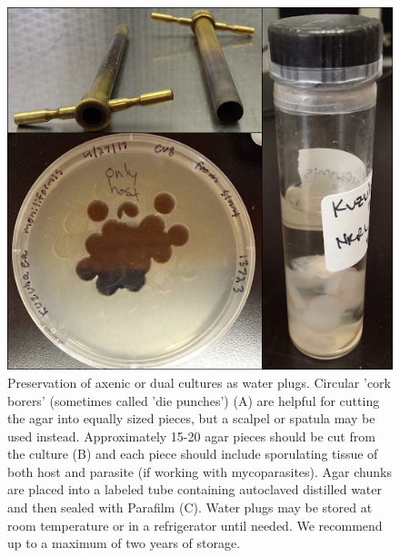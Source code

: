 \documentclass[]{book}
\begin{document}
\begin{figure}

{\centering \includegraphics[width=6.83in]{img/SupFig1_Ch2} 

}

\caption{Preservation of axenic or dual cultures as water plugs.  Circular 'cork borers' (sometimes called 'die punches') (A) are helpful for cutting the agar into equally sized pieces, but a scalpel or spatula may be used instead.  Approximately 15-20 agar pieces should be cut from the culture (B) and each piece should include sporulating tissue of both host and parasite (if working with mycoparasites).  Agar chunks are placed into a labeled tube containing autoclaved distilled water and then sealed with Parafilm (C).  Water plugs may be stored at room temperature or in a refrigerator until needed. We recommend up to a maximum of two years of storage.}\label{fig:ch2supfig1}
\end{figure}


\end{document}
